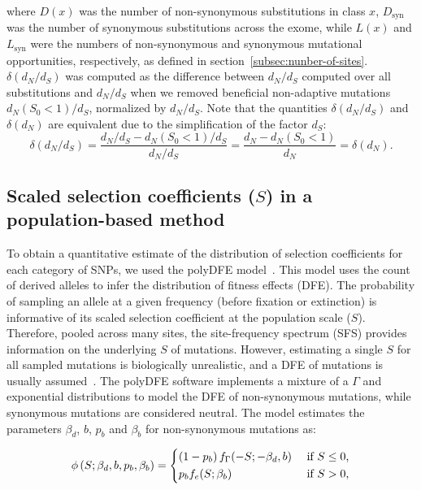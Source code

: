 \documentclass{article}
\newcommand{\dn}{d_N}
\newcommand{\ds}{d_S}
\newcommand{\dnds}{\dn / \ds}
\newcommand{\Sphy}{S_{0}}
\newcommand{\Sphyclass}{x}
\newcommand{\Spop}{S}
\newcommand{\AdvMean}{\beta_b}
\newcommand{\DelMean}{\beta_d}
\begin{document}
    where $D \left( \Sphyclass \right) $ was the number of non-synonymous substitutions in class $\Sphyclass$, $D_{\text{syn}}$ was the number of synonymous substitutions across the exome, while $L \left( \Sphyclass \right)$ and $L_{\text{syn}}$ were the numbers of non-synonymous and synonymous mutational opportunities, respectively, as defined in section~\ref{subsec:nunber-of-sites}.
    $\delta(\dnds)$ was computed as the difference between $\dnds$ computed over all substitutions and $\dnds$ when we removed beneficial non-adaptive mutations $\dn (\Sphy < 1) / \ds$, normalized by $\dnds$.
    Note that the quantities $\delta(\dnds)$ and $\delta(\dn)$ are equivalent due to the simplification of the factor $\ds$:
    \begin{equation}
        \delta(\dnds) = \dfrac{\dnds - \dn(\Sphy < 1) / \ds}{\dnds} = \dfrac{\dn - \dn(\Sphy < 1)}{\dn} = \delta(\dn).\label{eq:delta-dnds}
    \end{equation}

    \subsection{Scaled selection coefficients ($\Spop$) in a population-based method}
    \label{subsec:s-polymorphism-method}

    To obtain a quantitative estimate of the distribution of selection coefficients for each category of SNPs, we used the polyDFE model~\cite{tataru_inference_2017, tataru_polydfe_2020}.
    This model uses the count of derived alleles to infer the distribution of fitness effects (DFE).
    The probability of sampling an allele at a given frequency (before fixation or extinction) is informative of its scaled selection coefficient at the population scale ($\Spop$).
    Therefore, pooled across many sites, the site-frequency spectrum (SFS) provides information on the underlying $\Spop$ of mutations.
    However, estimating a single $\Spop$ for all sampled mutations is biologically unrealistic, and a DFE of mutations is usually assumed~\cite{eyre-walker_distribution_2006, eyre-walker_estimating_2009}.
    The polyDFE\cite{tataru_inference_2017, tataru_polydfe_2020} software implements a mixture of a $\Gamma$ and exponential distributions to model the DFE of non-synonymous mutations, while synonymous mutations are considered neutral.
    The model estimates the parameters $\DelMean$, $b$, $p_b$ and $\AdvMean$ for non-synonymous mutations as:

    \begin{equation}
        \phi \left( \Spop; \DelMean , b, p_b, \AdvMean \right) =
        \begin{dcases}
            \left( 1 - p_b \right) f_{\Gamma}(-\Spop; -\DelMean, b) & \text{ if $\Spop \leq 0$,} \\
            p_b f_{e}(\Spop; \AdvMean) & \text{ if $\Spop > 0$,} \\
        \end{dcases}
    \end{equation}
\end{document}
